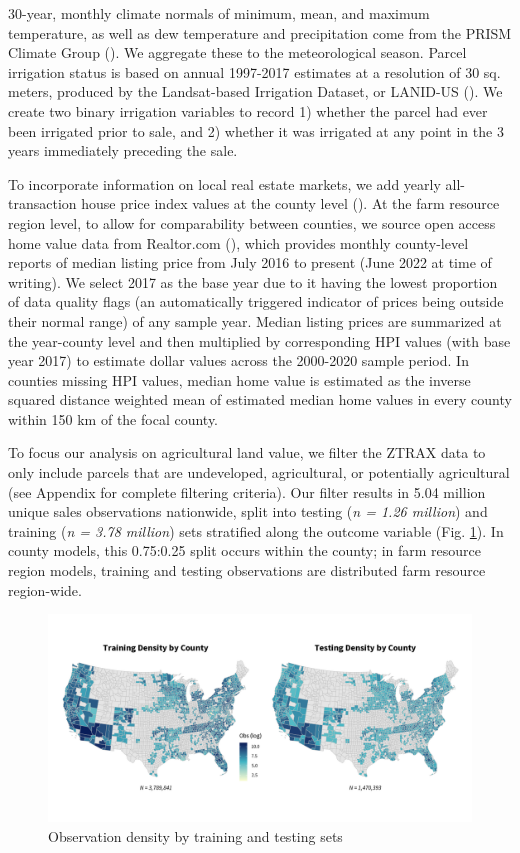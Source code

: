 \documentclass[12pt]{article}
\begin{document}
30-year, monthly climate normals of minimum, mean, and maximum temperature, as well as dew temperature and precipitation come from the PRISM Climate Group (\cite{PRISMClimate2021}). We aggregate these to the meteorological season. Parcel irrigation status is based on annual 1997-2017 estimates at a resolution of 30 sq. meters, produced by the Landsat-based Irrigation Dataset, or LANID-US (\cite{Xie2021MappingStates}). We create two binary irrigation variables to record 1) whether the parcel had ever been irrigated prior to sale, and 2) whether it was irrigated at any point in the 3 years immediately preceding the sale. 

To incorporate information on local real estate markets, we add yearly all-transaction house price index values at the county level (\cite{FederalHousing2022}). At the farm resource region level, to allow for comparability between counties, we source open access home value data from Realtor.com (\cite{RealtorData}), which provides monthly county-level reports of median listing price from July 2016 to present (June 2022 at time of writing). We select 2017 as the base year due to it having the lowest proportion of data quality flags (an automatically triggered indicator of prices being outside their normal range) of any sample year. Median listing prices are summarized at the year-county level and then multiplied by corresponding HPI values (with base year 2017) to estimate dollar values across the 2000-2020 sample period. In counties missing HPI values, median home value is estimated as the inverse squared distance weighted mean of estimated median home values in every county within 150 km of the focal county. 

To focus our analysis on agricultural land value, we filter the ZTRAX data to only include parcels that are undeveloped, agricultural, or potentially agricultural (see Appendix for complete filtering criteria).
Our filter results in 5.04 million unique sales observations nationwide, split into testing (\textit{n = 1.26 million}) and training (\textit{n = 3.78 million}) sets stratified along the outcome variable (Fig. \ref{fig:train_test}). In county models, this 0.75:0.25 split occurs within the county; in farm resource region models, training and testing observations are distributed farm resource region-wide. 

\begin{figure}
    \centering
    \includegraphics[width=1\textwidth]{archive/figures/test_train_density.png}
    \caption{Observation density by training and testing sets}
    \label{fig:train_test}
\end{figure}
\end{document}
